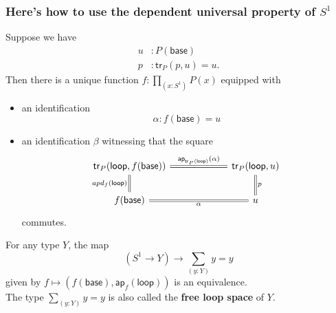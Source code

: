 \documentclass[handout]{beamer}
\newcommand{\sphere}[1]{S^{#1}}
\newcommand{\ap}{\mathsf{ap}}
\newcommand{\baseS}{\mathsf{base}}
\newcommand{\loopS}{\mathsf{loop}}
\newcommand{\tr}{\mathsf{tr}}
\newcommand{\apply}[2]{#1(#2)}
\begin{document}
\begin{frame}
  \frametitle{Here's how to use the dependent universal property of $\sphere{1}$}
  Suppose we have
  \begin{align*}
    u & : \apply{P}{\baseS} \\
    p & : \apply{\tr_P}{p,u}=u.
  \end{align*}
  Then there is a unique function $f:\prod_{(x:\sphere{1})}\apply{P}{x}$ equipped with\pause
  \begin{itemize}
  \item an identification
    \begin{equation*}
      \alpha : \apply{f}{\baseS} = u
    \end{equation*}\pause
  \item an identification $\beta$ witnessing that the square
    \begin{equation*}
      \begin{tikzcd}[ampersand replacement=\&,column sep=6em]
        \apply{\tr_P}{\loopS,\apply{f}{\baseS}} \arrow[d,equals,swap,"\apply{apd_f}{\loopS}"] \arrow[r,equals,"\apply{\ap_{\apply{\tr_P}{\loopS}}}{\alpha}"] \& \apply{\tr_P}{\loopS,u} \arrow[d,equals,"p"] \\
        \apply{f}{\baseS} \arrow[r,equals,swap,"\alpha"] \& u
      \end{tikzcd}
    \end{equation*}
    commutes.
  \end{itemize}
\end{frame}

\begin{frame}
  \begin{theorem}
    For any type $Y$, the map
    \begin{equation*}
      (\sphere{1}\to Y)\to \sum_{(y:Y)}y=y
    \end{equation*}
    given by $f\mapsto (\apply{f}{\baseS},\apply{\ap_f}{\loopS})$ is an equivalence.\\[1em]

    The type $\sum_{(y:Y)}y=y$ is also called the \textbf{free loop space} of $Y$.
  \end{theorem}
\end{frame}
\end{document}
